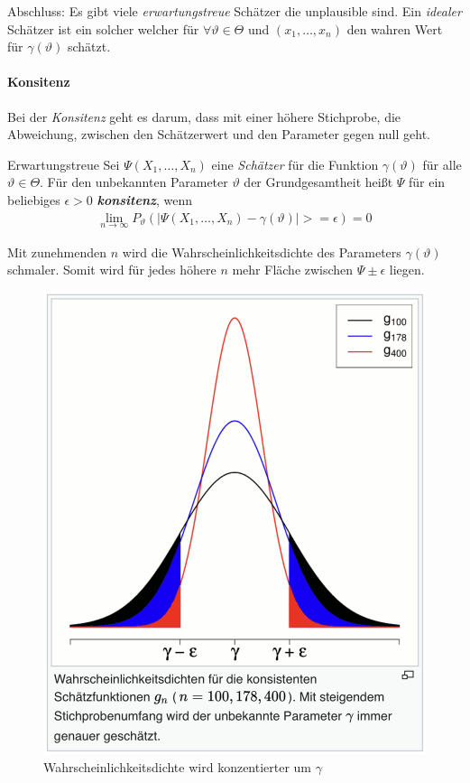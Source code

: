 Abschluss: Es gibt viele \textit{erwartungstreue} Schätzer die unplausible sind. Ein \textit{idealer} Schätzer ist ein solcher welcher für $\forall \vartheta \in \Theta$ und $(x_1,\dots,x_n)$ den wahren Wert für $\gamma(\vartheta)$ schätzt.

\paragraph{Konsitenz}
Bei der \textit{Konsitenz} geht es darum, dass mit einer höhere Stichprobe, die Abweichung, zwischen den Schätzerwert und den Parameter gegen null geht.

\begin{Definition}{Erwartungstreue}
	Sei $\Psi(X_1,\dots, X_n)$ eine \textit{Schätzer} für die Funktion $\gamma(\vartheta)$ für alle $\vartheta\in \Theta$. Für den unbekannten Parameter $\vartheta$ der Grundgesamtheit heißt $\Psi$ für ein beliebiges $\epsilon >0$ \textit{\textbf{konsitenz}}, wenn
\begin{align}
	\lim_{n\rightarrow \infty} P_{\vartheta}\left(\lvert \Psi(X_1,\dots,X_n) - \gamma(\vartheta)\rvert>= \epsilon \right) = 0
\end{align}	  
\end{Definition}
Mit zunehmenden $n$ wird die Wahrscheinlichkeitsdichte des Parameters $\gamma(\vartheta)$ schmaler. Somit wird für jedes höhere $n$ mehr Fläche zwischen $\Psi \pm \epsilon$ liegen.
\begin{figure}[H]
	\centering
	\includegraphics[width=0.7\linewidth]{attachment/chapter_13/Scc074}
	\caption{Wahrscheinlichkeitsdichte wird konzentierter um $\gamma$}
\end{figure}

